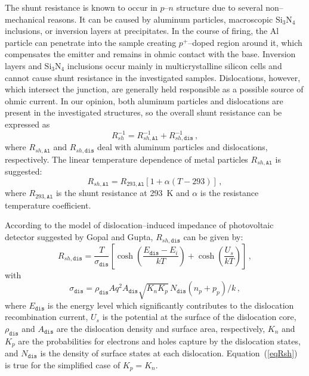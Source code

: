 \documentclass[aip,jap, amsmath,amssymb,reprint]{revtex4-1}
\begin{document}
The shunt resistance is known\cite{Rsh:Breitenstein} to occur in $p$--$n$ structure due to several non--mechanical reasons.
It can be caused by aluminum particles, macroscopic Si$_3$N$_4$ inclusions, or inversion layers at precipitates.
In the course of firing, the Al particle can penetrate into the sample creating $p^+$--doped region around it, which compensates the emitter and remains in ohmic contact with the base.
Inversion layers and Si$_3$N$_4$ inclusions occur mainly in multicrystalline silicon cells \cite{Rsh:Breitenstein} and cannot cause shunt resistance in the investigated samples.
Dislocations, however, which intersect the junction, are generally held responsible as a possible source of ohmic current.\cite{Rsh:Breitenstein,TAT:Gopal,Rsh:Baker}
In our opinion, both aluminum particles and dislocations are present in the investigated structures,
so the overall shunt resistance can be expressed as
\begin{equation}
\label{eqRshFull}
R_{sh}^{-1}=R_{sh,\mathtt{Al}}^{-1}+R_{sh,\mathtt{dis}}^{-1}\,,
\end{equation}
where
$R_{sh,\mathtt{Al}}$ and $R_{sh,\mathtt{dis}}$ deal with aluminum particles and dislocations, respectively.
The linear temperature dependence of metal particles $R_{sh,\mathtt{Al}}$ is suggested:
\begin{equation}
\label{eqRshAl}
R_{sh,\mathtt{Al}}=R_{293,\mathtt{Al}}[1+\alpha(T-293)]\,,
\end{equation}
where
$R_{293,\mathtt{Al}}$ is the shunt resistance at 293~K and
$\alpha$ is the resistance temperature coefficient.

According to the model of dislocation--induced impedance of photovoltaic detector suggested by Gopal and Gupta,\cite{Rsh:Gopal2003,Rsh:Gopal2004}
$R_{sh,\mathtt{dis}}$ can be given by:
\begin{equation}
\label{eqRsh}
R_{sh,\mathtt{dis}}=\frac{T}{\sigma_{\mathtt{dis}}}\left[\cosh\left(\frac{E_\mathtt{dis}-E_i}{kT}\right)+\cosh\left(\frac{U_s}{kT}\right)\right]\,,
\end{equation}
with
\begin{equation}
\label{eqRdis}
\sigma_{\mathtt{dis}}=\rho_{\mathtt{dis}}Aq^2A_{\mathtt{dis}}\sqrt{K_nK_p}\,N_{\mathtt{dis}}(n_p+p_p)/k\,,
\end{equation}
where
$E_{\mathtt{dis}}$ is the energy level which significantly contributes to the dislocation recombination current,
$U_s$ is the potential at the surface of the dislocation core,
$\rho_{\mathtt{dis}}$ and $A_{\mathtt{dis}}$ are the dislocation density and surface area, respectively,
$K_n$ and $K_p$ are the probabilities for electrons and holes capture by the dislocation states,
and $N_{\mathtt{dis}}$ is the density of surface states at each dislocation.
Equation~(\ref{eqRsh}) is true for the simplified case of $K_p=K_n$.
\end{document}
